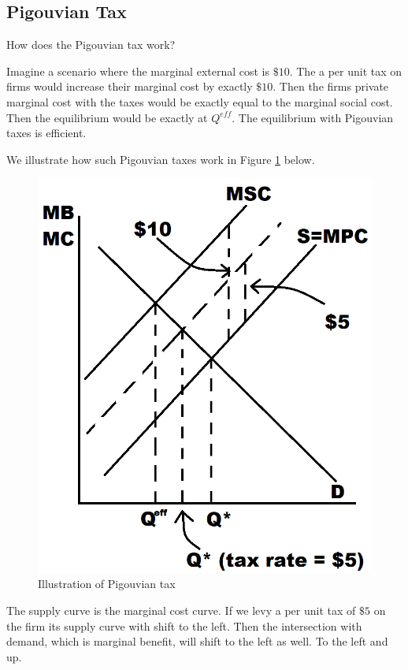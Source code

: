 \documentclass[
]{book}
\begin{document}
\hypertarget{pigouvian-tax}{%
\subsection{Pigouvian Tax}\label{pigouvian-tax}}

How does the Pigouvian tax work?

Imagine a scenario where the marginal external cost is \(\$10\). The a per unit tax on firms would increase their marginal cost by exactly \(\$10\). Then the firms private marginal cost with the taxes would be exactly equal to the marginal social cost. Then the equilibrium would be exactly at \(Q^{eff}\). The equilibrium with Pigouvian taxes is efficient.

We illustrate how such Pigouvian taxes work in Figure \ref{fig:extfig2} below.

\begin{figure}

{\centering \includegraphics[width=0.75\linewidth]{img/externalities/extfig2} 

}

\caption{Illustration of Pigouvian tax}\label{fig:extfig2}
\end{figure}

The supply curve is the marginal cost curve. If we levy a per unit tax of \(\$5\) on the firm its supply curve with shift to the left. Then the intersection with demand, which is marginal benefit, will shift to the left as well. To the left and up.
\end{document}
